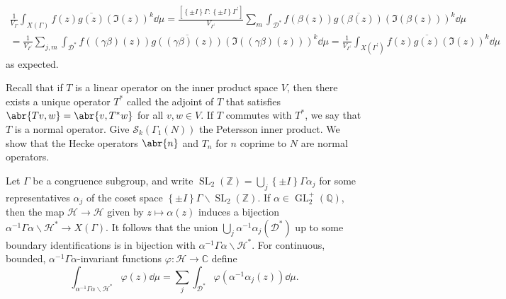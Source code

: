 \documentclass[10pt,leqno,twoside]{article}
\theoremstyle{plain}
\theoremstyle{definition}
\numberwithin{equation}{section}
\numberwithin{lem}{section}
\newcommand{\cbr}[1]{\left\{#1\right\}}
\DeclareMathOperator{\GL}{GL}
\DeclareMathOperator{\SL}{SL}
\newcommand{\slz}{\SL_2(\mathbb{Z})}
\newcommand{\glqp}{\GL_2^+(\mathbb{Q})}
\begin{document}
\begin{multline*}
    \frac{1}{V_{\varGamma}}\int_{X(\varGamma)}f(z)\overline{g(z)}(\Im(z))^k\dd\mu = \frac{[\cbr{\pm I}\varGamma:\cbr{\pm I}\varGamma^\prime]}{V_{\varGamma^\prime}}\sum_{m}\int_{\mathcal D^\ast}f(\beta(z))\overline{g(\beta(z))}(\Im(\beta(z)))^k\dd\mu \\ = \frac{1}{V_{\varGamma^\prime}}\sum_{j,m}\int_{\mathcal D^\ast} f((\gamma\beta)(z))\overline{g((\gamma\beta)(z))}(\Im((\gamma\beta)(z)))^k\dd\mu = \frac{1}{V_{\varGamma^\prime}}\int_{X(\varGamma^\prime)}f(z)\overline{g(z)}(\Im(z))^k\dd\mu
\end{multline*} as expected.

Recall that if $T$ is a linear operator on the inner product space $V$, then there exists a unique operator $T^\ast$ called the adjoint of $T$ that satisfies $\abr{Tv,w} = \abr{v,T^\ast w}$ for all $v,w\in V$. If $T$ commutes with $T^\ast$, we say that $T$ is a normal operator. Give $\mathcal S_k(\varGamma_1(N))$ the Petersson inner product. We show that the Hecke operators $\abr{n}$ and $T_n$ for $n$ coprime to $N$ are normal operators.

Let $\varGamma$ be a congruence subgroup, and write $\slz = \bigcup_j\cbr{\pm I}\varGamma \alpha_j$ for some representatives $\alpha_j$ of the coset space $\cbr{\pm I}\varGamma\backslash \slz$. If $\alpha\in\glqp$, then the map $\mathcal H\to\mathcal H$ given by $z \mapsto \alpha(z)$ induces a bijection $\alpha^{-1}\varGamma\alpha\backslash \mathcal H^\ast\to X(\varGamma)$. It follows that the union $\bigcup_j \alpha^{-1}\alpha_j(\mathcal D^\ast)$ up to some boundary identifications is in bijection with $\alpha^{-1}\varGamma\alpha\backslash \mathcal H^\ast$. For continuous, bounded, $\alpha^{-1}\varGamma\alpha$-invariant functions $\varphi\colon \mathcal H\to \mathbb C$ define
\[\int_{\alpha^{-1}\varGamma\alpha\backslash \mathcal H^\ast}\varphi(z)\dd\mu = \sum_j \int_{\mathcal D^\ast}\varphi(\alpha^{-1}\alpha_j(z))\dd\mu.\]
\end{document}
